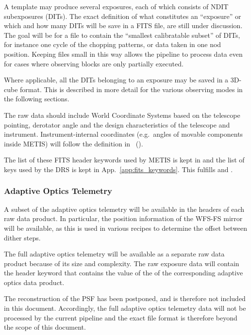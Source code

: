 A template may produce several exposures, each of which consists of
NDIT subexposures (DITs). The exact definition of what constitutes an
``exposure'' or which and how many DITs will be save in a FITS file,
are still under discussion. The goal will be for a file to contain the
``smallest calibratable subset'' of DITs, for instance one cycle of
the chopping patterns, or data taken in one nod position. Keeping files
small in this way allows the pipeline to process data even for cases
where observing blocks are only partially executed.

Where applicable, all the DITs belonging to an exposure may be saved
in a 3D-cube format. This is described in more detail for the various
observing modes in the following sections.

The raw data should include World Coordinate Systems based on the
telescope pointing, derotator angle and the design characteristics of
the telescope and instrument. Instrument-internal coordinates
(e.g.~angles of movable components inside METIS) will follow the
definition in~\cite{METIS-coordinates} ().

The list of these FITS header keywords used by METIS is kept in
\cite{METIS-DID} and the list of keys used by the \acs{DRS} is kept in App.~\ref{app:fits_keywords}. This fulfills  and .


\subsubsection{Adaptive Optics Telemetry}
A subset of the adaptive optics telemetry will be available in the headers of each raw data product.
In particular, the position information of the \ac{WFS-FS} mirror will be available, as this is used in various recipes to determine the offset between dither steps.

The full adaptive optics telemetry will be available as a separate raw data product because of its size and complexity.
The raw exposure data will contain the  header keyword that contains the value of the  of the corresponding adaptive optics data product.

The reconstruction of the PSF has been postponed, and is therefore not included in this document.
Accordingly, the full adaptive optics telemetry data will not be processed by the current pipeline and the exact file format is therefore beyond the scope of this document.

